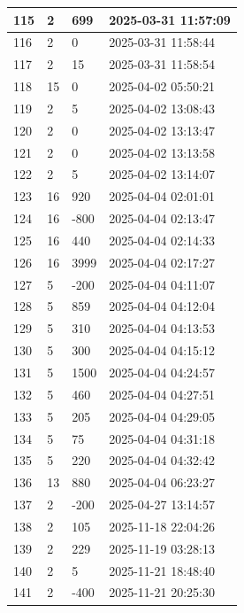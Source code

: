 \begin{longtable}{|l|l|l|l|}
115 & 2 & 699 & 2025-03-31 11:57:09 \\ \hline 
116 & 2 & 0 & 2025-03-31 11:58:44 \\ \hline 
117 & 2 & 15 & 2025-03-31 11:58:54 \\ \hline 
118 & 15 & 0 & 2025-04-02 05:50:21 \\ \hline 
119 & 2 & 5 & 2025-04-02 13:08:43 \\ \hline 
120 & 2 & 0 & 2025-04-02 13:13:47 \\ \hline 
121 & 2 & 0 & 2025-04-02 13:13:58 \\ \hline 
122 & 2 & 5 & 2025-04-02 13:14:07 \\ \hline 
123 & 16 & 920 & 2025-04-04 02:01:01 \\ \hline 
124 & 16 & -800 & 2025-04-04 02:13:47 \\ \hline 
125 & 16 & 440 & 2025-04-04 02:14:33 \\ \hline 
126 & 16 & 3999 & 2025-04-04 02:17:27 \\ \hline 
127 & 5 & -200 & 2025-04-04 04:11:07 \\ \hline 
128 & 5 & 859 & 2025-04-04 04:12:04 \\ \hline 
129 & 5 & 310 & 2025-04-04 04:13:53 \\ \hline 
130 & 5 & 300 & 2025-04-04 04:15:12 \\ \hline 
131 & 5 & 1500 & 2025-04-04 04:24:57 \\ \hline 
132 & 5 & 460 & 2025-04-04 04:27:51 \\ \hline 
133 & 5 & 205 & 2025-04-04 04:29:05 \\ \hline 
134 & 5 & 75 & 2025-04-04 04:31:18 \\ \hline 
135 & 5 & 220 & 2025-04-04 04:32:42 \\ \hline 
136 & 13 & 880 & 2025-04-04 06:23:27 \\ \hline 
137 & 2 & -200 & 2025-04-27 13:14:57 \\ \hline 
138 & 2 & 105 & 2025-11-18 22:04:26 \\ \hline 
139 & 2 & 229 & 2025-11-19 03:28:13 \\ \hline 
140 & 2 & 5 & 2025-11-21 18:48:40 \\ \hline 
141 & 2 & -400 & 2025-11-21 20:25:30 \\ \hline 
 \end{longtable}

